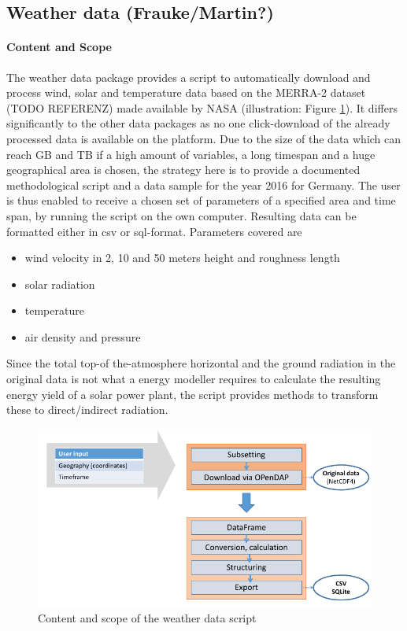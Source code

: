 \documentclass[article]{elsarticle}
\begin{document}
\subsection{Weather data (Frauke/Martin?)}

\paragraph{Content and Scope}
The weather data package provides a script to automatically download and process wind, solar and temperature data based on the MERRA-2 dataset (TODO REFERENZ) made available by NASA (illustration: Figure \ref{fig:weather data}). It differs significantly to the other data packages as no one click-download of the already processed data is available on the platform. Due to the size of the data which can reach GB and TB if a high amount of variables, a long timespan and a huge geographical area is chosen, the strategy here is to provide a documented methodological script and a data sample for the year 2016 for Germany. The user is thus enabled to receive a chosen set of parameters of a specified area and time span, by running the script on the own computer. Resulting data can be formatted either in csv or sql-format. Parameters covered are
\begin{itemize}
 \item wind velocity in 2, 10 and 50 meters height and roughness length
 \item solar radiation
 \item temperature
 \item air density and pressure
\end{itemize}

Since the total top-of the-atmosphere horizontal and the ground radiation in the original data is not what a energy modeller requires to calculate the resulting energy yield of a solar power plant, the script provides methods to transform these to direct/indirect radiation.

\begin{figure}[!h]
    \centering
    \includegraphics[width=1\textwidth]{figures/weather_data.png}
    \caption{Content and scope of the weather data script}
    \label{fig:weather data}
\end{figure}
\end{document}
